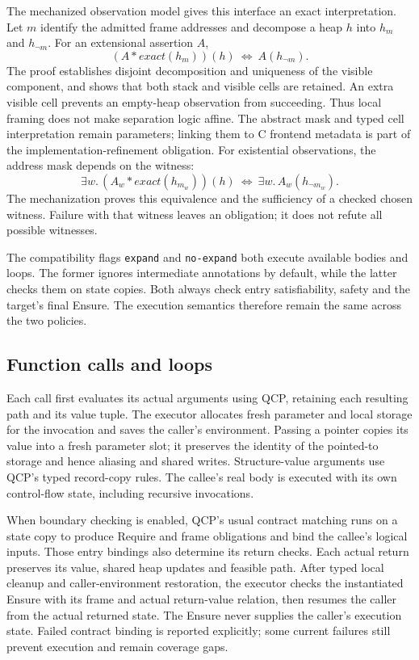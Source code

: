The mechanized observation model gives this interface an exact interpretation.
Let $m$ identify the admitted frame addresses and decompose a heap $h$ into
$h_m$ and $h_{\neg m}$. For an extensional assertion $A$,
\[
 (A*\mathit{exact}(h_m))(h)\ \Longleftrightarrow\ A(h_{\neg m}).
\]
The proof establishes disjoint decomposition and uniqueness of the visible
component, and shows that both stack and visible cells are retained. An extra
visible cell prevents an empty-heap observation from succeeding. Thus local
framing does not make separation logic affine. The abstract mask and typed
cell interpretation remain parameters; linking them to C frontend metadata
is part of the implementation-refinement obligation.
For existential observations, the address mask depends on the witness:
\[
 \exists w.\,(A_w*\mathit{exact}(h_{m_w}))(h)
 \ \Longleftrightarrow\ \exists w.\,A_w(h_{\neg m_w}).
\]
The mechanization proves this equivalence and the sufficiency of a checked
chosen witness. Failure with that witness leaves an obligation; it does not
refute all possible witnesses.

The compatibility flags \texttt{expand} and \texttt{no-expand} both execute
available bodies and loops. The former ignores intermediate annotations by
default, while the latter checks them on state copies. Both always check entry
satisfiability, safety and the target's final Ensure. The execution semantics
therefore remain the same across the two policies.

\subsection{Function calls and loops}

Each call first evaluates its actual arguments using QCP, retaining each
resulting path and its value tuple. The executor allocates fresh parameter and
local storage for the invocation and saves the caller's environment. Passing a
pointer copies its value into a fresh parameter slot; it preserves the identity
of the pointed-to storage and hence aliasing and shared writes. Structure-value
arguments use QCP's typed record-copy rules. The callee's real body is executed
with its own control-flow state, including recursive invocations.

When boundary checking is enabled, QCP's usual contract matching runs on a
state copy to produce Require and frame obligations and bind the callee's
logical inputs. Those entry bindings also determine its return checks. Each
actual return preserves its value, shared heap updates and feasible path.
After typed local cleanup and caller-environment restoration, the executor
checks the instantiated Ensure with its frame and actual return-value relation,
then resumes the caller from the actual returned state. The Ensure never
supplies the caller's execution state. Failed contract binding is reported
explicitly; some current failures still prevent execution and remain coverage
gaps.

